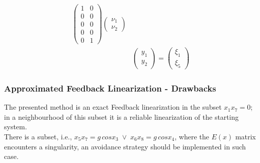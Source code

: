 \begin{frame}
\begin{equation}
\begin{aligned}
\begin{pmatrix}
	 		1 &0 \\
	 		0 &0 \\
	 		0 &0 \\
	 		0 &0 \\
	 		0 &1
	 	\end{pmatrix}
	 	\begin{pmatrix}
	 		\nu_1 \\ \nu_2
	 	\end{pmatrix}\\[6pt]
	 	&\begin{pmatrix}
	 		y_1\\ y_2
	 	\end{pmatrix}=%
	 	\begin{pmatrix}
	 		\xi_1\\ \xi_5
	 	\end{pmatrix}%
	\end{aligned}
\end{equation}
\end{frame}
%
\begin{frame}
\frametitle{Approximated Feedback Linearization - Drawbacks}
The presented method is an exact Feedback linearization in the subset $x_1x_7 = 0$; in a neighbourhood of this subset it is a reliable linearization of the starting system.\\
 There is a subset, i.e., $x_5x_7 = g\,cosx_3\; \lor\; x_6x_8 = g\,cosx_4$, where the $E(x)$ matrix encounters a singularity, an avoidance strategy should be implemented in such case.
\end{frame}
